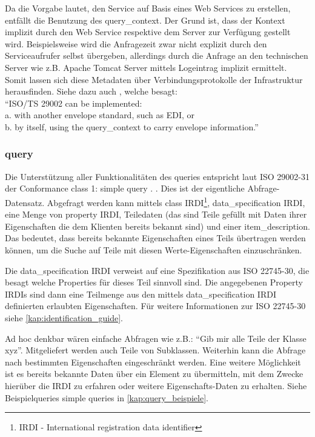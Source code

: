 Da die Vorgabe lautet, den Service auf Basis eines Web Services zu erstellen, entfällt die Benutzung des query\_context. Der Grund ist, dass der Kontext  implizit durch den Web Service respektive dem Server zur Verfügung gestellt wird. Beispielsweise wird die Anfragezeit zwar nicht explizit durch den Serviceaufrufer selbst übergeben, allerdings durch die Anfrage an den technischen Server wie z.B. Apache Tomcat Server mittels Logeintrag implizit ermittelt. Somit lassen sich diese Metadaten über Verbindungsprotokolle der Infrastruktur herausfinden.  
Siehe dazu auch \citep[Kap. 6][]{iso29002-31}, welche besagt: \\ \enquote{ISO/TS 29002 can be implemented: \\
a. with another envelope standard, such as EDI, or \\
b. by itself, using the query\_context to carry envelope information.}

\subsubsection{query}\label{sec:query}
Die Unterstützung aller Funktionalitäten des queries entspricht laut ISO 29002-31 der Conformance class 1: simple query \citep[Anhang 6][]{iso29002-31}. .
Dies ist der eigentliche Abfrage-Datensatz. Abgefragt werden kann mittels class IRDI\footnote{IRDI  - International registration data identifier}, data\_specification IRDI, eine Menge von property IRDI, Teiledaten (das sind Teile gefüllt mit Daten ihrer Eigenschaften die dem Klienten bereits bekannt sind) und einer item\_description. Das bedeutet, dass bereits bekannte Eigenschaften eines Teils übertragen werden können, um die Suche auf Teile mit diesen Werte-Eigenschaften einzuschränken.

Die data\_specification IRDI verweist auf eine Spezifikation aus ISO 22745-30, die besagt welche Properties für dieses Teil sinnvoll sind. Die angegebenen Property IRDIs sind dann eine Teilmenge aus den mittels data\_specification IRDI definierten erlaubten Eigenschaften. Für weitere Informationen zur ISO 22745-30 siehe \autoref{kap:identification_guide}. 

Ad hoc denkbar wären einfache Abfragen wie z.B.: \enquote{Gib mir alle Teile der Klasse xyz}. Mitgeliefert werden auch Teile von Subklassen. Weiterhin kann die Abfrage nach bestimmten Eigenschaften eingeschränkt werden. Eine weitere Möglichkeit ist es bereits bekannte Daten über ein Element zu übermitteln, mit dem Zwecke hierüber die IRDI zu erfahren oder weitere Eigenschafts-Daten zu erhalten. Siehe Beispielqueries simple queries in \autoref{kap:query_beispiele}. 

